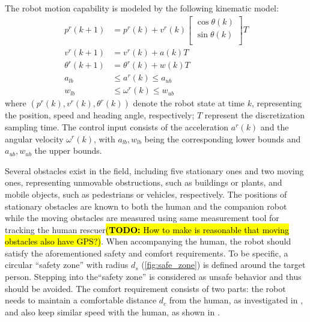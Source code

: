 \documentclass[letterpaper, 10 pt, conference]{ieeeconf}
\newcommand{\todohere}[1]{\hl{(\textbf{TODO:} #1)}}
\begin{document}
	The robot motion capability is modeled by the following kinematic model:
	\begin{subequations}
		\begin{align}
			p^r(k+1)&=p^r(k)+v^r(k)
			\left[ 
			\begin{array}{c}
				\cos \theta(k)\\
				\sin \theta(k)\\
			\end{array}
			\right]T\label{eqn:constr:dyn_pre_motion}\\
			v^r(k+1)&=v^r(k)+a(k)T\label{eqn:constr:dyn_pre_v}\\
			\theta^r(k+1)&=\theta^r(k)+w(k)T\label{eqn:constr:dyn_pre_theta}\\
			a_{lb}&\le a^r(k)\le a_{ub}\label{eqn:constr:a}\\
			w_{lb}&\le \omega^r(k)\le w_{ub}\label{eqn:constr:w}
		\end{align}
	\end{subequations}
	where $(p^r(k),v^r(k),\theta^r(k))$ denote the robot state at time $k$, representing the position, speed and heading angle, respectively; $T$ represent the discretization sampling time.
	The control input consists of the acceleration $a^r(k)$ and the angular velocity $\omega^r(k)$, with $a_{lb},w_{lb}$ being the corresponding lower bounds and $a_{ub},w_{ub}$ the upper bounds.
	
	Several obstacles exist in the field, including five stationary ones and two moving ones, representing unmovable obstructions, such as buildings or plants, and mobile objects, such as pedestrians or vehicles, respectively.
	The positions of stationary obstacles are known to both the human and the companion robot while the moving obstacles are measured using same measurement tool for tracking the human rescuer\todohere{How to make is reasonable that moving obstacles also have GPS?}.
	When accompanying the human, the robot should satisfy the aforementioned safety and comfort requirements.
	To be specific, a circular ``safety zone'' with radius $d_s$ (\cref{fig:safe_zone}) is defined around the target person.
	Stepping into the``safety zone'' is considered as unsafe behavior and thus should be avoided.
	The comfort requirement consists of two parts: the robot needs to maintain a comfortable distance $d_c$ from the human, as investigated in \cite{hall1968proxemics}, and also keep similar speed with the human, as shown in \cite{ref}.
	
\end{document}
